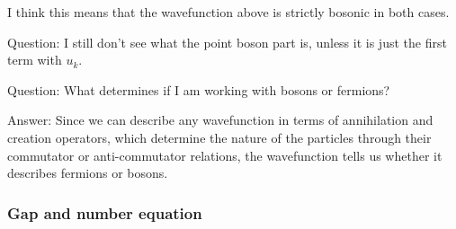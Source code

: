 \begin{description}
I think this means that the wavefunction above is strictly bosonic in both cases. 

Question: I still don't see what the point boson part is, unless it is just the first term with $u_k$. 

Question: What determines if I am working with bosons or fermions? 

Answer: Since we can describe any wavefunction in terms of annihilation and creation operators, which determine the nature of the particles through their commutator or anti-commutator relations, the wavefunction tells us whether it describes fermions or bosons. 

\end{description}

\subsubsection*{Gap and number equation}


